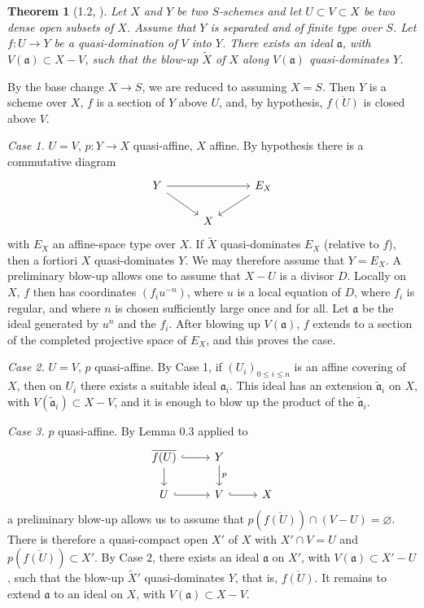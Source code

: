 \documentclass[10pt,a4paper]{article}
\theoremstyle{deligne}
\newtheorem*{theorem*}{Theorem}
\begin{document}
\begin{theorem*}[1.2, {\normalfont [2, Theorem 3.2]}]
Let \(X\) and \(Y\) be two \(S\)-schemes and let \(U\subset V\subset X\) be two dense open subsets of \(X\). Assume that \(Y\) is separated and of finite type over \(S\). Let \(f:U\to Y\) be a quasi-domination of \(V\) into \(Y\). There exists an ideal \(\mathfrak a\), with \(V(\mathfrak a)\subset X-V\), such that the blow-up \(\widetilde X\) of \(X\) along \(V(\mathfrak a)\) quasi-dominates \(Y\).
\end{theorem*}

By the base change \(X\to S\), we are reduced to assuming \(X=S\). Then \(Y\) is a scheme over \(X\), \(f\) is a section of \(Y\) above \(U\), and, by hypothesis, \(\overline{f(U)}\) is closed above \(V\).

\textit{Case 1.} \(U=V\), \(p:Y\to X\) quasi-affine, \(X\) affine. By hypothesis there is a commutative diagram
\[
\begin{tikzcd}[column sep=2.8em,row sep=1.6em]
Y \arrow[rr] \arrow[dr] && E_X \arrow[dl] \\
& X
\end{tikzcd}
\]
with \(E_X\) an affine-space type over \(X\). If \(\widetilde X\) quasi-dominates \(E_X\) (relative to \(f\)), then a fortiori \(X\) quasi-dominates \(Y\). We may therefore assume that \(Y=E_X\). A preliminary blow-up allows one to assume that \(X-U\) is a divisor \(D\). Locally on \(X\), \(f\) then has coordinates \((f_i u^{-n})\), where \(u\) is a local equation of \(D\), where \(f_i\) is regular, and where \(n\) is chosen sufficiently large once and for all. Let \(\mathfrak a\) be the ideal generated by \(u^n\) and the \(f_i\). After blowing up \(V(\mathfrak a)\), \(f\) extends to a section of the completed projective space of \(E_X\), and this proves the case.

\textit{Case 2.} \(U=V\), \(p\) quasi-affine. By Case 1, if \((U_i)_{0\le i\le n}\) is an affine covering of \(X\), then on \(U_i\) there exists a suitable ideal \(\mathfrak a_i\). This ideal has an extension \(\widetilde{\mathfrak a}_i\) on \(X\), with \(V(\widetilde{\mathfrak a}_i)\subset X-V\), and it is enough to blow up the product of the \(\widetilde{\mathfrak a}_i\).

\textit{Case 3.} \(p\) quasi-affine. By Lemma 0.3 applied to
\[
\begin{tikzcd}[column sep=2.5em,row sep=1.6em]
\overline{f(U)} \arrow[r,hook] \arrow[d] & Y \arrow[d,"p"] \\
U \arrow[r,hook] & V \arrow[r,hook] & X
\end{tikzcd}
\]
a preliminary blow-up allows us to assume that \(p(\overline{f(U)})\cap (V-U)=\varnothing\). There is therefore a quasi-compact open \(X'\) of \(X\) with \(X'\cap V=U\) and \(p(\overline{f(U)})\subset X'\). By Case 2, there exists an ideal \(\mathfrak a\) on \(X'\), with \(V(\mathfrak a)\subset X'-U\), such that the blow-up \(\widetilde X'\) quasi-dominates \(Y\), that is, \(\overline{f(U)}\). It remains to extend \(\mathfrak a\) to an ideal on \(X\), with \(V(\mathfrak a)\subset X-V\).
\end{document}
